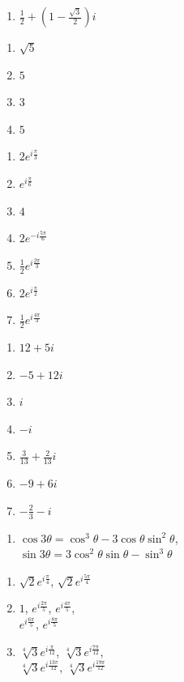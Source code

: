 \documentclass[a4paper,norsk,12pt]{article}
\begin{document}
\begin{appendix}
\begin{multicols}{3}
\begin{enumerate}[label=5\alph*)]
\item $\frac12 + \left(1-\frac{\sqrt{3}}{2}\right)i$
\end{enumerate}
\vspace{6pt}
\begin{enumerate}[label=6\alph*)]
\item $\sqrt{5}$
\item $5$
\item $3$
\item $5$
\end{enumerate}
\vspace{6pt}
\begin{enumerate}[label=7\alph*)]
\item $2e^{i\frac{\pi}{3}}$
\item $e^{i\frac{\pi}{6}}$
\item $4$
\item $2e^{-i\frac{5\pi}{6}}$
\item $\frac12e^{i\frac{2\pi}{3}}$
\item $2e^{i\frac{\pi}{2}}$
\item $\frac12 e^{i\frac{4\pi}{3}}$
\end{enumerate}
\vspace{6pt}
\begin{enumerate}[label=8\alph*)]
\item $12+5i$
\item $-5+12i$
\item $i$
\item $-i$
\item $\frac{3}{13}+\frac{2}{13}i$
\item $-9+6i$
\item $-\frac23-i$
\end{enumerate}
\vspace{6pt}
\begin{enumerate}[label=9)]
\item
$\cos3\theta = \cos^3\theta - 3\cos\theta\sin^2\theta$, \\
$\sin3\theta = 3\cos^2\theta\sin\theta-\sin^3\theta$
\end{enumerate}
\vspace{6pt}
\begin{enumerate}[label=10\alph*)]
\item $\sqrt{2}e^{i\frac{\pi}{4}}$, $\sqrt{2}e^{i\frac{5\pi}{4}}$
\item $1$, $e^{i\frac{2\pi}{5}}$, $e^{i\frac{4\pi}{5}}$,\\ $e^{i\frac{6\pi}{5}}$, $e^{i\frac{8\pi}{5}}$
\item $\sqrt[4]{3}e^{i\frac{\pi}{12}}$, $\sqrt[4]{3}e^{i\frac{7\pi}{12}}$, \\$\sqrt[4]{3}e^{i\frac{13\pi}{12}}$, $\sqrt[4]{3}e^{i\frac{19\pi}{12}}$

\end{enumerate}
\end{multicols}
\end{appendix}
\end{document}

